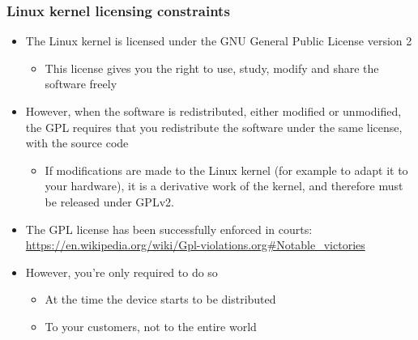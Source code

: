 \begin{frame}
  \frametitle{Linux kernel licensing constraints}
  \begin{itemize}
  \item The Linux kernel is licensed under the GNU General Public
    License version 2
    \begin{itemize}
    \item This license gives you the right to use, study, modify and
      share the software freely
    \end{itemize}
  \item However, when the software is redistributed, either modified
    or unmodified, the GPL requires that you redistribute the software
    under the same license, with the source code
    \begin{itemize}
    \item If modifications are made to the Linux kernel (for example
      to adapt it to your hardware), it is a derivative work of the
      kernel, and therefore must be released under GPLv2.
    \end{itemize}
  \item The GPL license has been successfully enforced in courts:
    \url{https://en.wikipedia.org/wiki/Gpl-violations.org\#Notable\_victories}
  \item However, you're only required to do so
    \begin{itemize}
    \item At the time the device starts to be distributed
    \item To your customers, not to the entire world
    \end{itemize}
  \end{itemize}
\end{frame}

